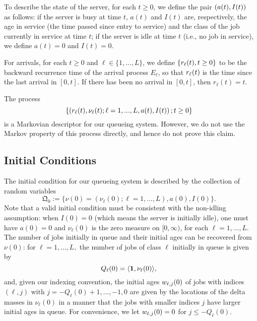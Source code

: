 \documentclass{article}
\numberwithin{equation}{section}
\begin{document}
To describe the state of the server, for each $t\geq 0$, we define the pair $(a(t),I(t))$ as follows: if the server is busy at time $t$, $a(t)$ and $I(t)$ are, respectively, the age in service (the time passed since entry to service) and the class of the job currently in service at time $t$; if the server is idle at time $t$ (i.e., no job in service), we define $a(t)=0$ and $I(t)=0$. 

For arrivals, for each $t\geq 0$ and $\ell \in \{ 1, \ldots, L\}$, we define $\{r_{\ell}(t),t\geq0\}$ to be the backward recurrence time of the arrival process $E_\ell$, so that $r_{\ell}(t)$ is the time since the last arrival in $[0,t]$.  If there has been no arrival in $[0,t]$, then $r_\ell(t) =t$.

The process
\[
\{\left( r_{\ell}(t), \nu_\ell(t);\ell=1,...,L,a(t),I(t) \right);t\geq0\}
\]
is a Markovian descriptor for our queueing system. However,  we do not use the Markov property of this process directly, and hence do not prove this claim.


\subsection{Initial Conditions\label{initialconditions}}
The initial condition for our queueing system is described by the collection of random variables
\begin{equation}\label{ic}
\mathfrak{Q}_0:=\{\nu(0)=(\nu_\ell(0);\ell=1,...,L),a(0),I(0)\}.
\end{equation}
Note that a valid initial condition must be consistent with the non-idling assumption: when $I(0)=0$ (which means the server is initially idle), one must have $a(0)=0$ and $\nu_\ell(0)$ is the zero measure on $[0, \infty)$,  for each $\ell=1,...,L$. The number of jobs initially in queue and their initial ages can be recovered from $\nu(0)$: for $\ell=1,...,L,$ the number of jobs of class $\ell$ initially in queue is given by 
\begin{equation}\label{QLzero}
Q_\ell(0)=\langle\f1,\nu_\ell(0) \rangle,
\end{equation}
and, given our indexing convention, the initial ages $w_{\ell,j}(0)$ of jobs with indices $(\ell,j)$ with $j=-Q_\ell(0)+1,...,-1,0$ are given by the locations of the delta masses in $\nu_\ell(0)$ in a manner that the jobs with smaller indices $j$ have larger initial ages in queue. For convenience, we let $w_{\ell,j}(0)=0$ for $j\leq -Q_\ell(0)$.
\end{document}
